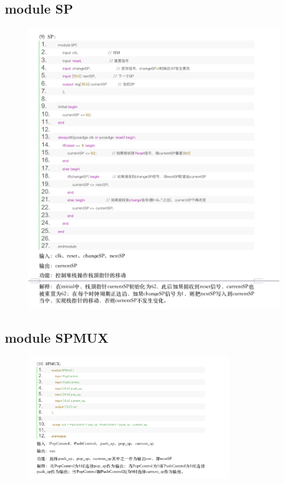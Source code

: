 \documentclass{article}
\begin{document}
\subsection{module SP}
\begin{figure}[H]
    \centering
    \includegraphics[width=1\textwidth]{pic/20.png}
    \end{figure}

\subsection{module SPMUX}
\begin{figure}[H]
    \centering
    \includegraphics[width=0.8\textwidth]{pic/21.png}
    \end{figure}
\end{document}
